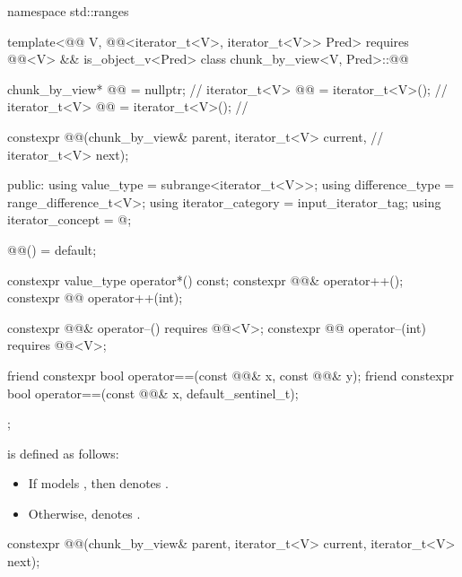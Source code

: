 %
\begin{codeblock}
namespace std::ranges {
  template<@@ V, @@<iterator_t<V>, iterator_t<V>> Pred>
    requires @@<V> && is_object_v<Pred>
  class chunk_by_view<V, Pred>::@@ {
    chunk_by_view* @@ = nullptr;                                   // \expos
    iterator_t<V> @@ = iterator_t<V>();                           // \expos
    iterator_t<V> @@    = iterator_t<V>();                           // \expos

    constexpr @@(chunk_by_view& parent, iterator_t<V> current,    // \expos
                       iterator_t<V> next);

  public:
    using value_type = subrange<iterator_t<V>>;
    using difference_type  = range_difference_t<V>;
    using iterator_category = input_iterator_tag;
    using iterator_concept = @\seebelow@;

    @@() = default;

    constexpr value_type operator*() const;
    constexpr @@& operator++();
    constexpr @@ operator++(int);

    constexpr @@& operator--() requires @@<V>;
    constexpr @@ operator--(int) requires @@<V>;

    friend constexpr bool operator==(const @@& x, const @@& y);
    friend constexpr bool operator==(const @@& x, default_sentinel_t);
  };
}
\end{codeblock}

\pnum
{} is defined as follows:
\begin{itemize}
\item
If  models ,
then  denotes .
\item
Otherwise,  denotes .
\end{itemize}

%
\begin{itemdecl}
constexpr @@(chunk_by_view& parent, iterator_t<V> current, iterator_t<V> next);
\end{itemdecl}

